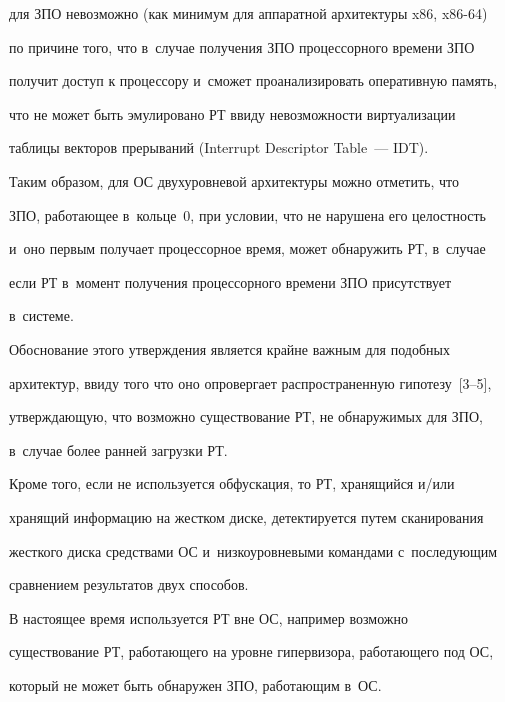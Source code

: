 для ЗПО невозможно (как минимум для аппаратной архитектуры x86, x86-64) 


по причине того, что в~случае получения ЗПО процессорного времени ЗПО 


получит доступ к процессору и~сможет проанализировать оперативную память, 


что не может быть эмулировано РТ ввиду невозможности виртуализации 


таблицы векторов прерываний (Interrupt Descriptor Table~--- IDT).


  


  Таким образом, для ОС двухуровневой архитектуры можно отметить, что 


ЗПО, работающее в~кольце~0, при условии, что не нарушена его целостность 


и~оно первым получает процессорное время, может обнаружить РТ, в~случае 


если РТ в~момент получения процессорного времени ЗПО присутствует 


в~системе.


  


  Обоснование этого утверждения является крайне важным для подобных 


архитектур, ввиду того что оно опровергает распространенную гипотезу~[3--5], 


утверждающую, что возможно существование РТ, не обнаружимых для ЗПО, 


в~случае более ранней загрузки РТ.


  


  Кроме того, если не используется обфускация, то РТ, хранящийся и/или 


хранящий информацию на жестком диске, детектируется путем сканирования 


жесткого диска средствами ОС и~низкоуровневыми командами с~последующим 


сравнением результатов двух способов. 


  


  В настоящее время используется РТ вне ОС, например возможно 


существование РТ, работающего на уровне гипервизора, работающего под ОС, 


который не может быть обнаружен ЗПО, работающим в~ОС.


